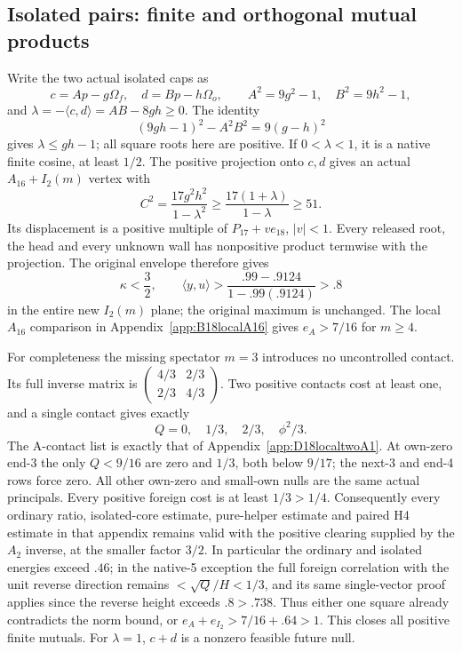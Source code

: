 \documentclass[11pt]{article}
\theoremstyle{definition}
\theoremstyle{remark}
\newcommand{\ip}[2]{\langle #1,#2\rangle}
\begin{document}
\subsection{Isolated pairs: finite and orthogonal mutual products}
\label{app:D18isolatedfinite}

Write the two actual isolated caps as
\[
 c=Ap-g\Omega_f,\quad d=Bp-h\Omega_o,\qquad
 A^2=9g^2-1,\quad B^2=9h^2-1,
\]
and \(\lambda=-\ip cd=AB-8gh\ge0\).
The identity
\[
 (9gh-1)^2-A^2B^2=9(g-h)^2
\]
gives \(\lambda\le gh-1\); all square roots here are positive.
If \(0<\lambda<1\), it is a native finite cosine, at least \(1/2\).
The positive projection onto \(c,d\) gives an actual
\(A_{16}+I_2(m)\) vertex with
\[
 C^2={\frac{17g^2h^2}{1-\lambda^2}}
 \ge {\frac{17(1+\lambda)}{1-\lambda}}\ge51.
\]
Its displacement is a positive multiple of
\(P_{17}+ve_{18}\), \(|v|<1\).
Every released root, the head and every unknown wall has
nonpositive product termwise with the projection.
The original envelope therefore gives
\[
 \kappa<{\frac{3}{2}},\qquad
 \ip yu>{\frac{.99-.9124}{1-.99(.9124)}}>.8
\]
in the entire new \(I_2(m)\) plane; the original maximum is
unchanged.  The local \(A_{16}\) comparison in
Appendix~\ref{app:B18localA16} gives \(e_A>7/16\) for \(m\ge4\).

For completeness the missing spectator \(m=3\) introduces no
uncontrolled contact.  Its full inverse matrix is
\(\left(\begin{smallmatrix}4/3&2/3\\2/3&4/3\end{smallmatrix}\right)\).
Two positive contacts cost at least one, and a single contact gives
exactly
\[
                  Q=0,\quad1/3,\quad2/3,\quad\phi^2/3 .
\]
The A-contact list is exactly that of
Appendix~\ref{app:D18localtwoA1}.
At own-zero end-3 the only \(Q<9/16\) are zero and \(1/3\),
both below \(9/17\); the next-3 and end-4 rows force zero.
All other own-zero and small-own nulls are the same actual principals.
Every positive foreign cost is at least \(1/3>1/4\).
Consequently every ordinary ratio, isolated-core estimate,
pure-helper estimate and paired H4 estimate in that appendix
remains valid with the positive clearing supplied by the
\(A_2\) inverse, at the smaller factor \(3/2\).
In particular the ordinary and isolated energies exceed \(.46\);
in the native-5 exception the full foreign correlation with the
unit reverse direction remains \(<\sqrt Q/H<1/3\),
and its same single-vector proof applies since the reverse height
exceeds \(.8>.738\).
Thus either one square already contradicts the norm bound, or
\(e_A+e_{I_2}>7/16+.64>1\).
This closes all positive finite mutuals.
For \(\lambda=1\), \(c+d\) is a nonzero feasible future null.
\end{document}
